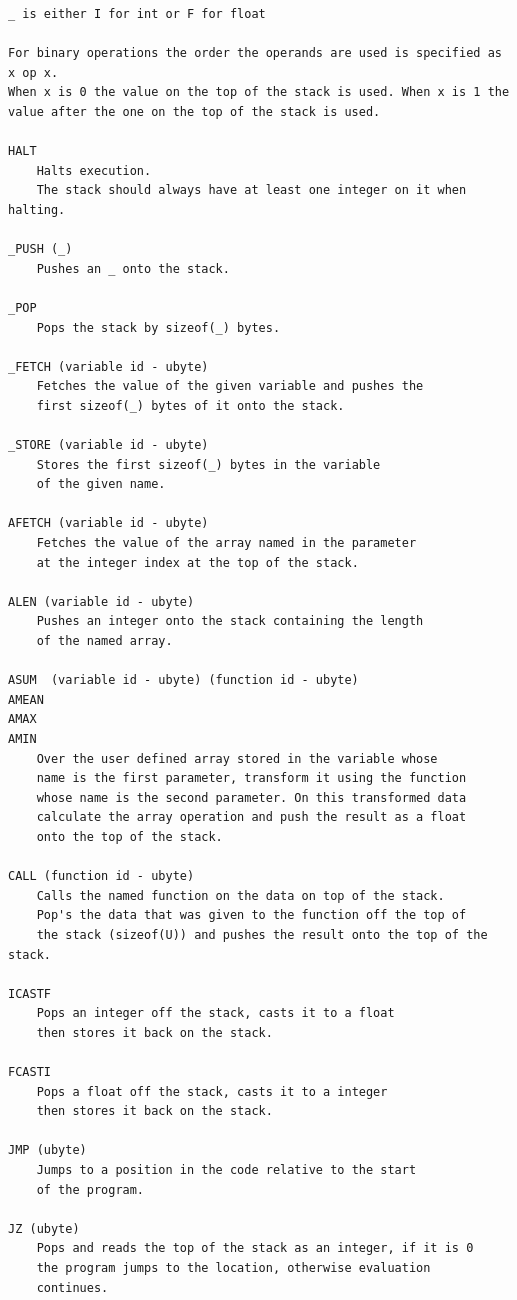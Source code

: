 \begin{verbatim}
_ is either I for int or F for float

For binary operations the order the operands are used is specified as x op x.
When x is 0 the value on the top of the stack is used. When x is 1 the
value after the one on the top of the stack is used.

HALT
    Halts execution.
    The stack should always have at least one integer on it when halting.

_PUSH (_)
    Pushes an _ onto the stack.

_POP
    Pops the stack by sizeof(_) bytes.

_FETCH (variable id - ubyte)
    Fetches the value of the given variable and pushes the
    first sizeof(_) bytes of it onto the stack.

_STORE (variable id - ubyte)
    Stores the first sizeof(_) bytes in the variable
    of the given name.

AFETCH (variable id - ubyte)
    Fetches the value of the array named in the parameter
    at the integer index at the top of the stack.

ALEN (variable id - ubyte)
    Pushes an integer onto the stack containing the length
    of the named array.
	
ASUM  (variable id - ubyte) (function id - ubyte)
AMEAN
AMAX
AMIN
    Over the user defined array stored in the variable whose
    name is the first parameter, transform it using the function
    whose name is the second parameter. On this transformed data
    calculate the array operation and push the result as a float
    onto the top of the stack.

CALL (function id - ubyte)
    Calls the named function on the data on top of the stack.
    Pop's the data that was given to the function off the top of
    the stack (sizeof(U)) and pushes the result onto the top of the stack.

ICASTF
    Pops an integer off the stack, casts it to a float
    then stores it back on the stack.

FCASTI
    Pops a float off the stack, casts it to a integer
    then stores it back on the stack.

JMP (ubyte)
    Jumps to a position in the code relative to the start
    of the program.

JZ (ubyte)
    Pops and reads the top of the stack as an integer, if it is 0
    the program jumps to the location, otherwise evaluation
    continues.


\end{verbatim}
